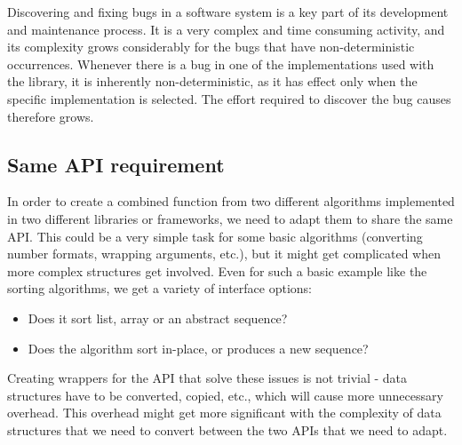 Discovering and fixing bugs in a software system is a key part of its development and maintenance process. It is a very complex and time consuming activity, and its complexity grows considerably for the bugs that have non-deterministic occurrences. Whenever there is a bug in one of the implementations used with the library, it is inherently non-deterministic, as it has effect only when the specific implementation is selected. The effort required to discover the bug causes therefore grows.

\subsection{Same API requirement}

In order to create a combined function from two different algorithms implemented in two different libraries or frameworks, we need to adapt them to share the same API. This could be a very simple task for some basic algorithms (converting number formats, wrapping arguments, etc.), but it might get complicated when more complex structures get involved. Even for such a basic example like the sorting algorithms, we get a variety of interface options:

\begin{itemize}
	\item Does it sort list, array or an abstract sequence?
	\item Does the algorithm sort in-place, or produces a new sequence?
\end{itemize}

Creating wrappers for the API that solve these issues is not trivial - data structures have to be converted, copied, etc., which will cause more unnecessary overhead. This overhead might get more significant with the complexity of data structures that we need to convert between the two APIs that we need to adapt.